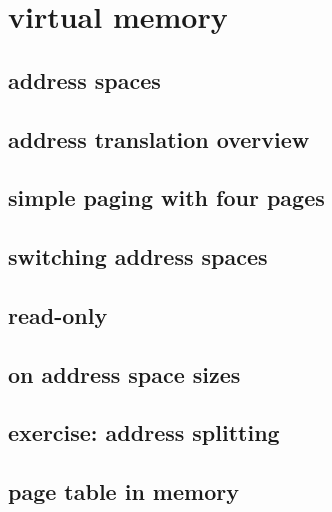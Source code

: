 

\section{virtual memory}

\subsection{address spaces}



\subsection{address translation overview}




\subsection{simple paging with four pages}


\subsection{switching address spaces}


\subsection{read-only}

\subsection{on address space sizes}


\subsection{exercise: address splitting}


\subsection{page table in memory}


